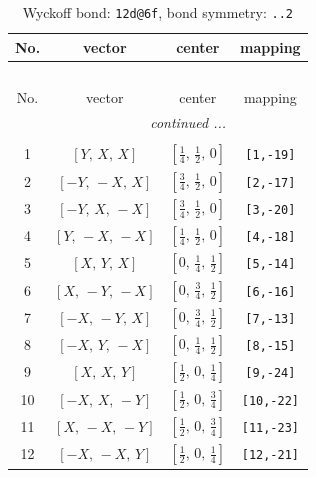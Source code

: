 \documentclass[fleqn,8pt]{jsarticle}
\begin{document}
\begin{longtable}{cccc}
\caption{Wyckoff bond: {\tt 12d@6f}, bond symmetry: {\tt ..2}}
 \\
 \hline \hline
No. & vector & center & mapping \\ \hline \endfirsthead

\multicolumn{3}{l}{\tablename\ \thetable{}} \\
 \hline \hline
No. & vector & center & mapping \\ \hline \endhead

 \hline \hline
\multicolumn{3}{r}{\footnotesize\it continued ...} \\ \endfoot

 \hline \hline
\multicolumn{3}{r}{} \\ \endlastfoot

1 & $\left[ Y,\, X,\, X \right]$ & $\left[ \frac{1}{4},\, \frac{1}{2},\, 0 \right]$ & {\tt [1,-19]} \\ \hline
2 & $\left[ - Y,\, - X,\, X \right]$ & $\left[ \frac{3}{4},\, \frac{1}{2},\, 0 \right]$ & {\tt [2,-17]} \\ \hline
3 & $\left[ - Y,\, X,\, - X \right]$ & $\left[ \frac{3}{4},\, \frac{1}{2},\, 0 \right]$ & {\tt [3,-20]} \\ \hline
4 & $\left[ Y,\, - X,\, - X \right]$ & $\left[ \frac{1}{4},\, \frac{1}{2},\, 0 \right]$ & {\tt [4,-18]} \\ \hline
5 & $\left[ X,\, Y,\, X \right]$ & $\left[ 0,\, \frac{1}{4},\, \frac{1}{2} \right]$ & {\tt [5,-14]} \\ \hline
6 & $\left[ X,\, - Y,\, - X \right]$ & $\left[ 0,\, \frac{3}{4},\, \frac{1}{2} \right]$ & {\tt [6,-16]} \\ \hline
7 & $\left[ - X,\, - Y,\, X \right]$ & $\left[ 0,\, \frac{3}{4},\, \frac{1}{2} \right]$ & {\tt [7,-13]} \\ \hline
8 & $\left[ - X,\, Y,\, - X \right]$ & $\left[ 0,\, \frac{1}{4},\, \frac{1}{2} \right]$ & {\tt [8,-15]} \\ \hline
9 & $\left[ X,\, X,\, Y \right]$ & $\left[ \frac{1}{2},\, 0,\, \frac{1}{4} \right]$ & {\tt [9,-24]} \\ \hline
10 & $\left[ - X,\, X,\, - Y \right]$ & $\left[ \frac{1}{2},\, 0,\, \frac{3}{4} \right]$ & {\tt [10,-22]} \\ \hline
11 & $\left[ X,\, - X,\, - Y \right]$ & $\left[ \frac{1}{2},\, 0,\, \frac{3}{4} \right]$ & {\tt [11,-23]} \\ \hline
12 & $\left[ - X,\, - X,\, Y \right]$ & $\left[ \frac{1}{2},\, 0,\, \frac{1}{4} \right]$ & {\tt [12,-21]} \\
\end{longtable}
\end{document}

